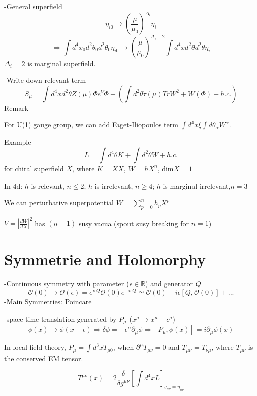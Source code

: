 \documentclass[type = bachelor]{fduthesis-en}
\begin{document}
\noindent-General superfield 
$$\eta_{i0}\rightarrow(\frac{\mu}{\mu_0})^{\Delta_i}\eta_i$$
$$\Rightarrow \int d^4x_0 d^2\theta_0 d^2\bar{\theta_0}\eta_{i0}\rightarrow(\frac{\mu}{\mu_0})^{\Delta_i-2}\int d^4x d^2\theta d^2\bar{\theta}\eta_i$$
$\Delta_i=2$ is marginal superfield.

\noindent-Write down relevant term
\begin{equation}
S_{\mu}=\int d^4x d^2\theta Z(\mu) \bar{\Phi}e^V\Phi+(\int d^2\theta\dot{\tau}(\mu)TrW^2+W(\Phi)+h.c.)
\end{equation}
Remark

For U(1) gauge group, we can add Faget-Iliopoulos term $\int d^4x \xi \int d\theta_{\alpha}W^{\alpha}$.

\noindent Example
$$L=\int d^4\theta K + \int d^2\theta W + h.c.$$ for chiral superfield $X$, where $K=\bar{X}X$, $W=hX^n$, dim$X=1$

In 4d: $h$ is relevant, $n\leq2$; $h$ is irrelevant, $n\geq4$; $h$ is marginal irrelevant,$n=3$

We can perturbative superpotential $W=\sum_{p=0}^nh_pX^p$

$V=\left|\frac{dW}{dX}\right|^2$ has $(n-1)$ susy vacua (spout susy breaking for $n=1$)

\section{Symmetrie and Holomorphy}
-Continuous symmetry with parameter ($\epsilon \in \mathbb{R}$) and generator $Q$
\begin{equation}
\mathcal{O}(0)\rightarrow\mathcal{O}(\epsilon)=e^{i\epsilon Q}\mathcal{O}(0)e^{-i\epsilon Q}\simeq \mathcal{O}(0)+i\epsilon[Q,\mathcal{O}(0)]+...
\end{equation}
-Main Symmetries: Poincare

-space-time translation generated by $P_{\mu}$ ($x^\mu\rightarrow x^\mu+\epsilon^\mu$)
\begin{equation}
\phi(x)\rightarrow\phi(x-\epsilon)\Rightarrow \delta\phi=-\epsilon^\mu\partial_\mu\phi\Rightarrow[P_\mu,\phi(x)]=i\partial_\mu\phi(x)
\end{equation}

In local field theory, $P_\mu=\int d^3x T_{\mu0}$, when $\partial^\mu T_{\mu\nu}=0$ and $T_{\mu\nu}=T_{\nu\mu}$, where $T_{\mu\nu}$ is the conserved EM tensor.

\begin{equation}
T^{\mu\nu}(x)=2\frac{\delta}{\delta g^{\mu\nu}}[\int d^4xL]_{g_{\mu\nu}=\eta_{\mu\nu}}
\end{equation}
\end{document}
